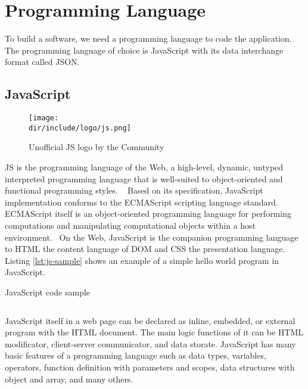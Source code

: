 \section{Programming Language}
\label{sec:programming}

To build a software, we need a programming language to code the application.
The programming language of choice is JavaScript with its data interchange format called JSON.

\subsection{JavaScript}

\begin{wrapfigure}{r}{0.5\textwidth}
  \vspace{-20pt}
  \begin{center}
    \texttt{[image: \\dir/include/logo/js.png]}
  \end{center}
  \vspace{-20pt}
  \caption{Unofficial JS logo by the Community}
  \label{fig:js-logo}
  \vspace{-10pt}
\end{wrapfigure}

\ac{JS} is the programming language of the Web, a high-level, dynamic, untyped interpreted programming language that is well-suited to object-oriented and functional programming styles.
~\autocite{Flanagan:2011:JS}
Based on its specification, JavaScript implementation conforms to the ECMAScript\textsuperscript{\textregistered} scripting language standard.
ECMAScript itself is an object-oriented programming language for performing computations and manipulating computational objects within a host environment.~\autocite{ECMA:2011:ECMAScript}
On the Web, JavaScript is the companion programming language to \ac{HTML} the content language of \ac{DOM} and \ac{CSS} the presentation language.
Listing \autoref{lst:js-sample} shows an example of a simple hello world program in JavaScript.

\begin{listing}[htbp]
\caption{JavaScript code sample}
\inputminted{javascript}{\dir/include/js-sample.js}
\label{lst:js-sample}
\end{listing}

JavaScript itself in a web page can be declared as inline, embedded, or external program with the \ac{HTML} document.
The main logic functions of it can be \ac{HTML} modificator, client-server communicator, and data storate.
JavaScript has many basic features of a programming language such as data types, variables, operators, function definition with parameters and scopes, data structures with object and array, and many others.

